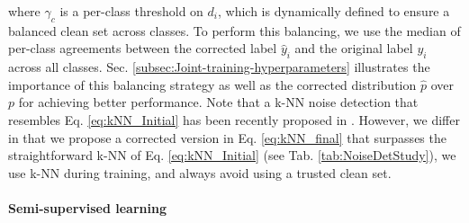 \documentclass[final]{cvpr}
\begin{document}
where $\gamma_{c}$ is a per-class threshold on $d_{i}$, which is dynamically
defined to ensure a balanced clean set across classes. To perform this balancing, we use the median of per-class agreements between the corrected label $\hat{y}_{i}$ and the original label $y_{i}$ across all classes. Sec. \ref{subsec:Joint-training-hyperparameters} illustrates the importance of this balancing strategy as well as the corrected distribution $\hat{p}$ over $p$ for achieving better performance. Note that a k-NN noise detection that resembles Eq. \ref{eq:kNN_Initial} has been recently proposed in \cite{2020_ICML_DeepKNN}. However, we differ in that we propose a corrected version in Eq. \ref{eq:kNN_final} that surpasses the straightforward k-NN of Eq. \ref{eq:kNN_Initial} (see Tab. \ref{tab:NoiseDetStudy}), we use k-NN during training, and always avoid using a trusted clean set.

\paragraph*{Semi-supervised learning}
\end{document}
